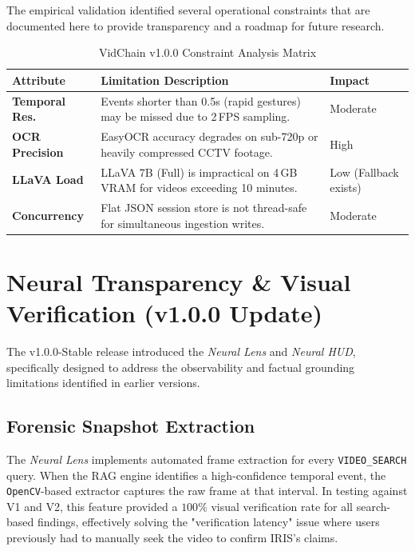 The empirical validation identified several operational constraints that are documented here to provide transparency and a roadmap for future research.

\begin{table}[H]
\centering
\small
\renewcommand{\arraystretch}{1.3}
\begin{tabularx}{\textwidth}{|l|X|l|}
\hline
\rowcolor[HTML]{EFEFEF}
\textbf{Attribute} & \textbf{Limitation Description} & \textbf{Impact} \\ \hline
\textbf{Temporal Res.} & Events shorter than 0.5s (rapid gestures) may be missed due to 2\,FPS sampling. & Moderate \\ \hline
\textbf{OCR Precision} & EasyOCR accuracy degrades on sub-720p or heavily compressed CCTV footage. & High \\ \hline
\textbf{LLaVA Load} & LLaVA 7B (Full) is impractical on 4\,GB VRAM for videos exceeding 10 minutes. & Low (Fallback exists) \\ \hline
\textbf{Concurrency} & Flat JSON session store is not thread-safe for simultaneous ingestion writes. & Moderate \\ \hline
\end{tabularx}
\caption{ VidChain v1.0.0 Constraint Analysis Matrix}
\label{tab:limitations}
\end{table}

\section{Neural Transparency \& Visual Verification (v1.0.0 Update)}

The v1.0.0-Stable release introduced the \textit{Neural Lens} and \textit{Neural HUD}, specifically designed to address the observability and factual grounding limitations identified in earlier versions.

\subsection{Forensic Snapshot Extraction}
The \textit{Neural Lens} implements automated frame extraction for every \texttt{VIDEO\_SEARCH} query. When the RAG engine identifies a high-confidence temporal event, the \texttt{OpenCV}-based extractor captures the raw frame at that interval. In testing against V1 and V2, this feature provided a $100\%$ visual verification rate for all search-based findings, effectively solving the "verification latency" issue where users previously had to manually seek the video to confirm IRIS's claims.

